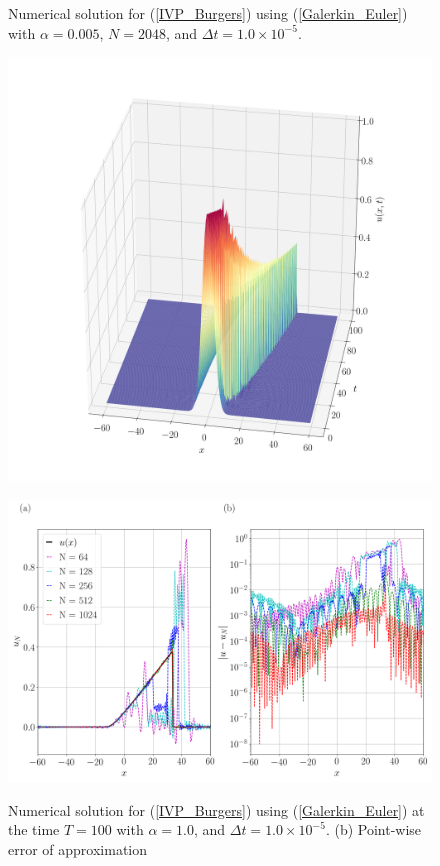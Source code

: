 	\begin{figure}[H]
		\centering
		\caption{Numerical solution for (\ref{IVP_Burgers}) using (\ref{Galerkin_Euler}) with $\alpha = 0.005$, $N=2048$, and $\Delta t = 1.0 \times 10^{-5}$.}
		\includegraphics[width=12cm]{burgers_equation/deterministic/numerical_experiments/viscid/figures/galerkin/Numerical_Solution_alpha=0005.png}
		\caption{Numerical solution for (\ref{IVP_Burgers}) using (\ref{Galerkin_Euler}) at the time $T = 100$ with $\alpha = 1.0$, and $\Delta t = 1.0 \times 10^{-5}$. (b) Point-wise error of approximation}
		\includegraphics[width=12.5cm]{burgers_equation/deterministic/numerical_experiments/viscid/figures/galerkin/Numerical_Solution_alpha=0005_T=100.png}
		\label{Galerkin_alpha=005_T}
	\end{figure}
	
